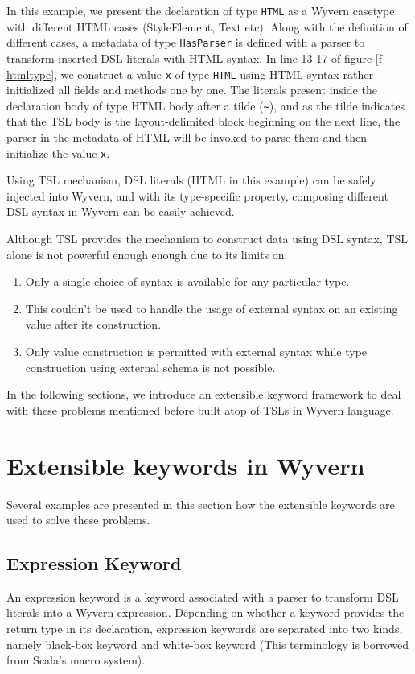 \documentclass{sig-alternate}
\begin{document}
In this example, we present the declaration of type \verb|HTML| as a Wyvern casetype with different HTML cases (StyleElement, Text etc). Along with the definition of different cases, a metadata of type \verb|HasParser| is defined with a parser to transform inserted DSL literals with HTML syntax. In line 13-17 of figure \ref{f-htmltype}, we construct a value \verb|x| of type \verb|HTML| using HTML syntax rather initialized all fields and methods one by one. The literals present inside the declaration body of type HTML body after a tilde (\verb|~|), and as the tilde indicates that the TSL body is the layout-delimited block beginning on the next line, the parser in the metadata of HTML will be invoked to parse them and then initialize the value \verb|x|.

Using TSL mechanism, DSL literals (HTML in this example) can be safely injected into Wyvern, and with its type-specific property, composing different DSL syntax in Wyvern can be easily achieved. 

Although TSL provides the mechanism to construct data using DSL syntax, TSL alone is not powerful enough enough due to its limits on: 
\begin{enumerate}\setlength{\itemsep}{0pt}
\item Only a single choice of syntax is available for any particular type.
\item This couldn't be used to handle the usage of external syntax on an existing value after its construction.
\item Only value construction is permitted with external syntax while type construction using external schema is not possible.
\end{enumerate}

In the following sections, we introduce an extensible keyword framework to deal with these problems mentioned before built atop of TSLs in Wyvern language. 

\section{Extensible keywords in Wyvern}
Several examples are presented in this section how the extensible keywords are used to solve these problems.
\subsection{Expression Keyword}
An expression keyword is a keyword associated with a parser to transform DSL literals into a Wyvern expression. Depending on whether a keyword provides the return type in its declaration, expression keywords are separated into two kinds, namely black-box keyword and white-box keyword (This terminology is borrowed from Scala's macro system). 
\end{document}
